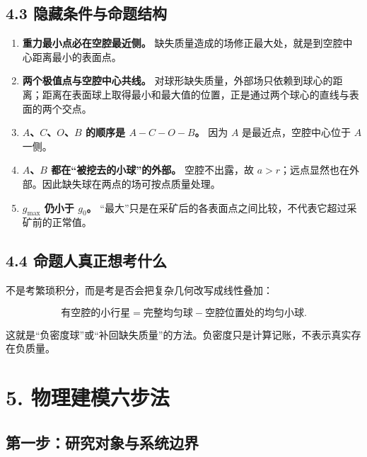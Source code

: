 \documentclass[
  11pt,
  UTF8]{ctexart}
\providecommand{\tightlist}{%
  \setlength{\itemsep}{0pt}\setlength{\parskip}{0pt}}
\begin{document}
\hypertarget{ux9690ux85cfux6761ux4ef6ux4e0eux547dux9898ux7ed3ux6784}{%
\subsection{4.3
隐藏条件与命题结构}\label{ux9690ux85cfux6761ux4ef6ux4e0eux547dux9898ux7ed3ux6784}}

\begin{enumerate}
\def\labelenumi{\arabic{enumi}.}
\tightlist
\item
  \textbf{重力最小点必在空腔最近侧。}
  缺失质量造成的场修正最大处，就是到空腔中心距离最小的表面点。
\item
  \textbf{两个极值点与空腔中心共线。}
  对球形缺失质量，外部场只依赖到球心的距离；距离在表面球上取得最小和最大值的位置，正是通过两个球心的直线与表面的两个交点。
\item
  \textbf{\(A\)、\(C\)、\(O\)、\(B\) 的顺序是 \(A-C-O-B\)。} 因为 \(A\)
  是最近点，空腔中心位于 \(A\) 一侧。
\item
  \textbf{\(A\)、\(B\) 都在``被挖去的小球''的外部。} 空腔不出露，故
  \(a>r\)；远点显然也在外部。因此缺失球在两点的场可按点质量处理。
\item
  \textbf{\(g_{\max}\) 仍小于 \(g_0\)。}
  ``最大''只是在采矿后的各表面点之间比较，不代表它超过采矿前的正常值。
\end{enumerate}

\hypertarget{ux547dux9898ux4ebaux771fux6b63ux60f3ux8003ux4ec0ux4e48}{%
\subsection{4.4
命题人真正想考什么}\label{ux547dux9898ux4ebaux771fux6b63ux60f3ux8003ux4ec0ux4e48}}

不是考繁琐积分，而是考是否会把复杂几何改写成线性叠加：

\[\text{有空腔的小行星}=\text{完整均匀球}-\text{空腔位置处的均匀小球}.\]

这就是``负密度球''或``补回缺失质量''的方法。负密度只是计算记账，不表示真实存在负质量。

\hypertarget{ux7269ux7406ux5efaux6a21ux516dux6b65ux6cd5}{%
\section{5.
物理建模六步法}\label{ux7269ux7406ux5efaux6a21ux516dux6b65ux6cd5}}

\hypertarget{ux7b2cux4e00ux6b65ux7814ux7a76ux5bf9ux8c61ux4e0eux7cfbux7edfux8fb9ux754c}{%
\subsection{第一步：研究对象与系统边界}\label{ux7b2cux4e00ux6b65ux7814ux7a76ux5bf9ux8c61ux4e0eux7cfbux7edfux8fb9ux754c}}
\end{document}
